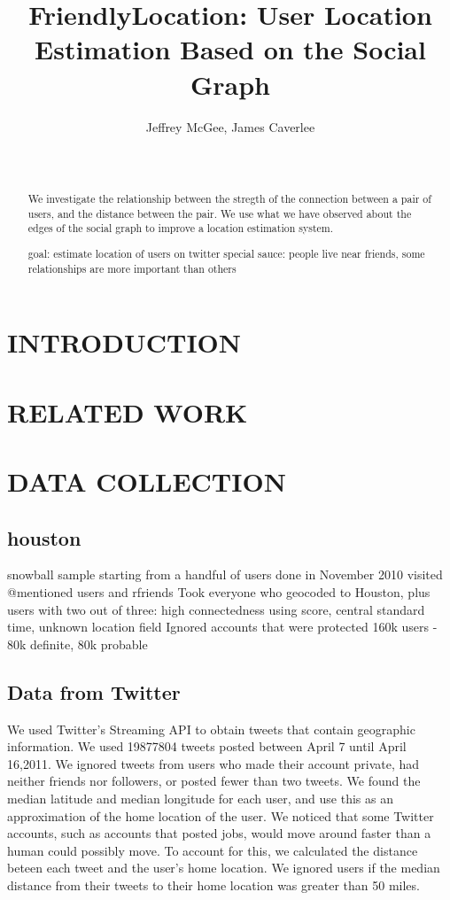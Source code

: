 \documentclass{sig-alternate}
\title{FriendlyLocation: User Location Estimation Based on the Social Graph}
\author{
    \alignauthor Jeffrey McGee, James Caverlee\\
    \affaddr{Department of Computer Science and Engineering, Texas A\&M
    University} \\
    \affaddr{ College Station, TX 77845 USA} \\
    \email{jeffamcgee@tamu.edu, caverlee@cse.tamu.edu}
}
\begin{document}
\maketitle
\begin{abstract}
We investigate the relationship between the stregth of the connection between a pair of users, and the distance between the pair.
We use what we have observed about the edges of the social graph to improve a location estimation system.

goal: estimate location of users on twitter
special sauce: people live near friends, some relationships are more important than others
\end{abstract}




\section{INTRODUCTION}


\section{RELATED WORK}


\section{DATA COLLECTION}
\subsection{houston}
snowball sample starting from a handful of users done in November 2010
visited @mentioned users and rfriends
Took everyone who geocoded to Houston, plus users with two out of three:
    high connectedness using score,
    central standard time,
    unknown location field
Ignored accounts that were protected
160k users - 80k definite, 80k probable


\subsection{Data from Twitter}
We used Twitter's Streaming API to obtain tweets that contain geographic information.
We used 19877804 tweets posted between April 7 until April 16,2011.
We ignored tweets from users who made their account private, had neither friends nor followers, or posted fewer than two tweets.
We found the median latitude and median longitude for each user, and use this as an approximation of the home location of the user.
We noticed that some Twitter accounts, such as accounts that posted jobs, would move around faster than a human could possibly move. To account for this, we calculated the distance beteen each tweet and the user's home location. We ignored users if the median distance from their tweets to their home location was greater than 50 miles.
\end{document}
